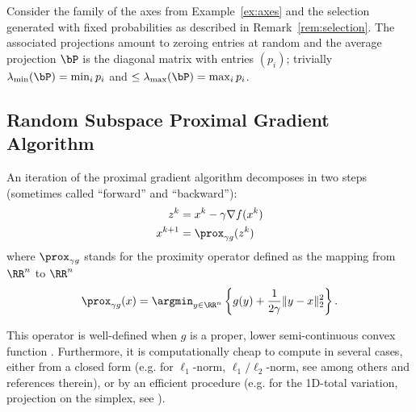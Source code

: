 {
\begin{example}\label{ex:P}
Consider the family of the axes from Example~\ref{ex:axes} and the selection generated with fixed probabilities as described in Remark~\ref{rem:selection}. The associated projections amount to zeroing entries at random and the average projection $\bP$ is the diagonal matrix with entries $(p_i)$; trivially $\lambda_{\min}(\bP)= \min_i p_i$ and $\leq \lambda_{\max}(\bP) = \max_i p_i$.
\end{example}}

\subsection{Random Subspace Proximal Gradient Algorithm} \label{sec:algo}

An iteration of the proximal gradient algorithm 
decomposes in two steps (sometimes called ``forward'' and  ``backward''):
\begin{subequations}\label{eq:pgGradProx}
    \begin{align}
    \label{eq:pgGrad} z^k &= x^{k} - \gamma \nabla f(x^k)\\
        \label{eq:pgProx} x^{k+1} &= \prox_{\gamma g}(z^k)
\end{align}
\end{subequations}
where $\prox_{\gamma g}$ stands for the proximity operator defined as the mapping 
from $\RR^n$ to $\RR^n$
\begin{equation}
    \prox_{\gamma g}(x) = \argmin_{y\in\RR^n}\left\{g(y) + \frac{1}{2\gamma} \|y-x\|_2^2\right\} .
\end{equation}

This operator is well-defined when $g$ is a proper, lower semi-continuous convex function \cite[Def.~12.23]{bauschke2011convex}. Furthermore, it is computationally cheap to compute in several cases, either from a closed form ({e.g.} for $\ell_1$-norm, $\ell_1/\ell_2$-norm, see among others \cite{combettes2007proximal} and references therein), or by an efficient procedure ({e.g.} for the 1D-total variation, projection on the simplex, see \cite{yuan2011efficient,condat2013direct}).


